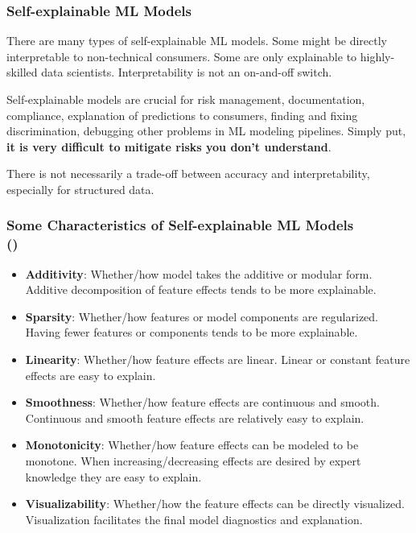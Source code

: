 \documentclass[11pt,aspectratio=169,hyperref={colorlinks}]{beamer}
\begin{document}
		\begin{frame}
	
			\frametitle{Self-explainable ML Models}			
	
			\small
			
			There are many types of self-explainable ML models. Some might be directly interpretable to non-technical consumers. Some are only explainable to highly-skilled data scientists. Interpretability is not an on-and-off switch.
			
			\vspace{10pt}
			
			Self-explainable models are crucial for risk management, documentation, compliance, explanation of predictions to consumers, finding and fixing discrimination, debugging other problems in ML modeling pipelines. Simply put, \textbf{it is very difficult to mitigate risks you don't understand}.
			
			\vspace{10pt}
			
			There is not necessarily a trade-off between accuracy and interpretability, especially for structured data.
			
			\normalsize
			
		\end{frame}	

		\begin{frame}
	
			\frametitle{Some Characteristics of Self-explainable ML Models\\ (\small{\cite{sudjianto2021designing})}}			
			
			\small
			
			\begin{itemize}
				\item \textbf{Additivity}: Whether/how model takes the additive or modular form. Additive decomposition of feature effects tends to be more explainable.
				\item \textbf{Sparsity}: Whether/how features or model components are regularized. Having fewer features or components tends to be more explainable.
				\item \textbf{Linearity}: Whether/how feature effects are linear. Linear or constant feature effects are easy to explain.
				\item \textbf{Smoothness}: Whether/how feature effects are continuous and smooth. Continuous and smooth feature effects are relatively easy to explain.
				\item \textbf{Monotonicity}: Whether/how feature effects can be modeled to be monotone. When increasing/decreasing effects are desired by expert knowledge they are easy to explain.
				\item \textbf{Visualizability}: Whether/how the feature effects can be directly visualized. Visualization facilitates the final model diagnostics and explanation.
			\end{itemize}
			
			\normalsize
			
		\end{frame}	
\end{document}
